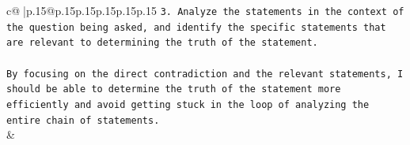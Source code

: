 \documentclass{article}
\begin{document}
{\begin{supertabular}{c@{$\;$}|p{.15\linewidth}@{}p{.15\linewidth}p{.15\linewidth}p{.15\linewidth}p{.15\linewidth}p{.15\linewidth}}
{{{\texttt{3. Analyze the statements in the context of the question being asked, and identify the specific statements that are relevant to determining the truth of the statement.} \\
\\ 
\texttt{By focusing on the direct contradiction and the relevant statements, I should be able to determine the truth of the statement more efficiently and avoid getting stuck in the loop of analyzing the entire chain of statements.} \\
            }
        }
    }
    & \\ \\

\end{supertabular}
}
\end{document}
